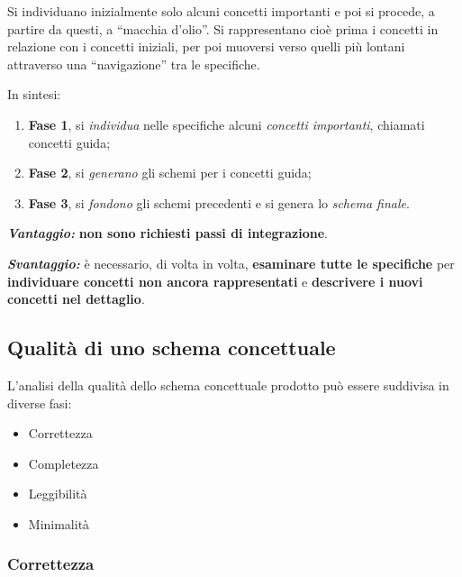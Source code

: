 \documentclass[a4paper]{article}
\newcommand{\dquotes}[1]{``#1''}
\begin{document}
	Si individuano inizialmente solo alcuni concetti importanti e poi si procede, a partire da questi, a \dquotes{macchia d'olio}. Si rappresentano cioè prima i concetti in relazione con i concetti iniziali, per poi muoversi verso quelli più lontani attraverso una \dquotes{navigazione} tra le specifiche.\newline
	
	\noindent
	In sintesi:
	
	\begin{enumerate}
		\item \textbf{Fase 1}, si \emph{individua} nelle specifiche alcuni \emph{concetti importanti}, chiamati concetti guida;
		
		\item \textbf{Fase 2}, si \emph{generano} gli schemi per i concetti guida;
		
		\item \textbf{Fase 3}, si \emph{fondono} gli schemi precedenti e si genera lo \emph{schema finale}.
	\end{enumerate}
	
	\noindent
	\textcolor{Green4}{\textbf{\emph{Vantaggio:}}} \textbf{non sono richiesti passi di integrazione}.\newline
	
	\noindent
	\textcolor{Red3}{\textbf{\emph{Svantaggio:}}} è necessario, di volta in volta, \textbf{esaminare tutte le specifiche} per \textbf{individuare concetti non ancora rappresentati} e \textbf{descrivere i nuovi concetti nel dettaglio}.
	
	\newpage
	
	\subsection{Qualità di uno schema concettuale}
	
	L'analisi della qualità dello schema concettuale prodotto può essere suddivisa in diverse fasi:
	
	\begin{itemize}
		\item Correttezza
		\item Completezza
		\item Leggibilità
		\item Minimalità
	\end{itemize}

	\subsubsection{Correttezza}\label{correttezza}
\end{document}
